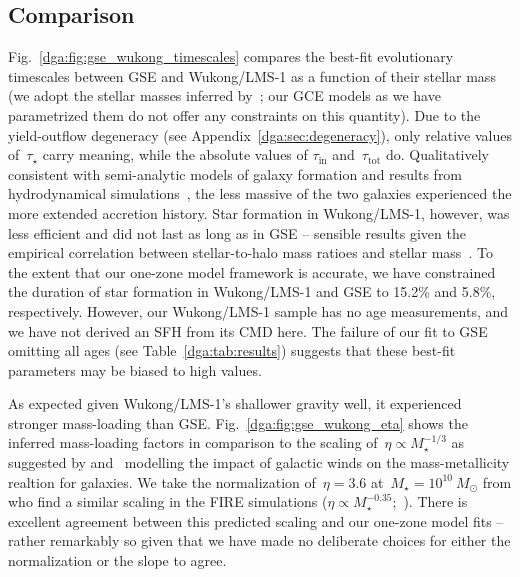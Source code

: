 \subsection{Comparison}
\label{dga:sec:h3:comparison}
{\sloppy
Fig.~\ref{dga:fig:gse_wukong_timescales} compares the best-fit evolutionary
timescales between GSE and \linebreak Wukong/LMS-1 as a function of their
stellar mass (we adopt the stellar masses inferred by~\citealt{Naidu2021,
Naidu2022}; our GCE models as we have parametrized them do not offer any
constraints on this quantity).
}
Due to the yield-outflow degeneracy (see Appendix~\ref{dga:sec:degeneracy}), only
relative values of~$\tau_\star$ carry meaning, while the absolute values of
$\tau_\text{in}$ and~$\tau_\text{tot}$ do.
Qualitatively consistent with semi-analytic models of galaxy formation
\citep[e.g.,][]{Baugh2006, Somerville2015a, Behroozi2019} and results from
hydrodynamical simulations~\citep[e.g.,][]{GarrisonKimmel2019}, the less
massive of the two galaxies experienced the more extended accretion history.
Star formation in Wukong/LMS-1, however, was less efficient and did not last as
long as in GSE -- sensible results given the empirical correlation between
stellar-to-halo mass ratioes and stellar mass~\citep{Hudson2015}.
To the extent that our one-zone model framework is accurate, we have
constrained the duration of star formation in Wukong/LMS-1 and GSE to 15.2\%
and 5.8\%, respectively.
However, our Wukong/LMS-1 sample has no age measurements, and we have not
derived an SFH from its CMD here.
The failure of our fit to GSE omitting all ages (see Table~\ref{dga:tab:results})
suggests that these best-fit parameters may be biased to high values.
\par
{\sloppy
As expected given Wukong/LMS-1's shallower gravity well, it experienced
\linebreak stronger mass-loading than GSE.
}
Fig.~\ref{dga:fig:gse_wukong_eta} shows the inferred mass-loading factors in
comparison to the scaling of~$\eta \propto M_\star^{-1/3}$ as suggested by
\citet{Finlator2008} and~\citet{Peeples2011} modelling the impact of galactic
winds on the mass-metallicity realtion for galaxies.
We take the normalization of~$\eta = 3.6$ at~$M_\star = 10^{10}~M_\odot$ from
\citet{Muratov2015} who find a similar scaling in the FIRE simulations
($\eta \propto M_\star^{-0.35}$;~\citealp{Hopkins2014}).
There is excellent agreement between this predicted scaling and our one-zone
model fits -- rather remarkably so given that we have made no deliberate
choices for either the normalization or the slope to agree.
